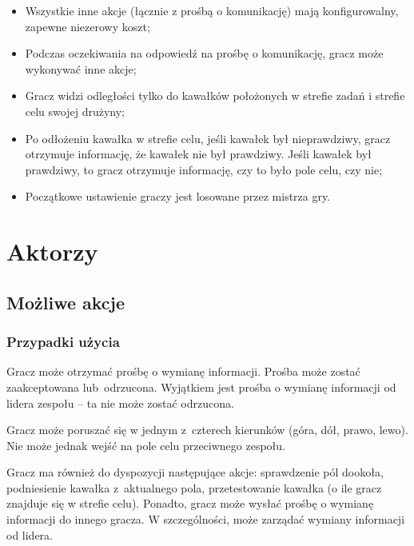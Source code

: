 \documentclass[a4paper]{article}
\begin{document}
\begin{itemize}
\item
  Wszystkie inne akcje (łącznie z prośbą o komunikację) mają konfigurowalny, zapewne niezerowy koszt;
\item
  Podczas oczekiwania na odpowiedź na prośbę o komunikację, gracz może wykonywać inne akcje;
\item
  Gracz widzi odległości tylko do kawałków położonych w strefie zadań i strefie celu swojej drużyny;
\item
  Po odłożeniu kawałka w strefie celu, jeśli kawałek był nieprawdziwy, gracz otrzymuje informację, że kawałek nie był prawdziwy. Jeśli kawałek był prawdziwy, to gracz otrzymuje informację, czy to było pole celu, czy nie;
\item
  Początkowe ustawienie graczy jest losowane przez mistrza gry.
\end{itemize}

\section{Aktorzy}


\subsection{Możliwe akcje}


\subsubsection{Przypadki użycia}


Gracz może otrzymać prośbę o wymianę informacji.
Prośba może zostać zaakceptowana lub~odrzucona.
Wyjątkiem jest prośba o wymianę informacji od lidera zespołu -- ta nie może zostać odrzucona.

Gracz może poruszać się w jednym z~czterech kierunków (góra, dół, prawo, lewo).
Nie może jednak wejść na pole celu przeciwnego zespołu.

Gracz ma również do dyspozycji następujące akcje: sprawdzenie pól dookoła, podniesienie kawałka z~aktualnego pola, przetestowanie kawałka (o ile gracz znajduje się w strefie celu).
Ponadto, gracz może wysłać prośbę o wymianę informacji do innego gracza.
W szczególności, może zarządać wymiany informacji od lidera.


\end{document}
